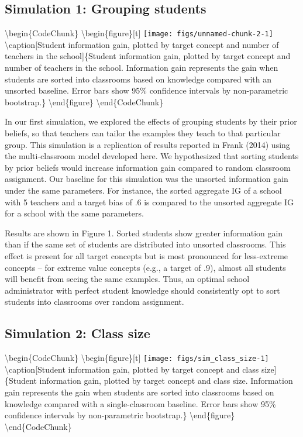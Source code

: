 \documentclass[10pt, letterpaper]{article}
\begin{document}
\subsection{Simulation 1: Grouping
students}\label{simulation-1-grouping-students}

\textbackslash{}begin\{CodeChunk\}
\textbackslash{}begin\{figure\}{[}t{]}
\texttt{[image: figs/unnamed-chunk-2-1]}
\textbackslash{}caption{[}Student information gain, plotted by target
concept and number of teachers in the school{]}\{Student information
gain, plotted by target concept and number of teachers in the school.
Information gain represents the gain when students are sorted into
classrooms based on knowledge compared with an unsorted baseline. Error
bars show 95\% confidence intervals by non-parametric
bootstrap.\}\label{fig:unnamed-chunk-2} \textbackslash{}end\{figure\}
\textbackslash{}end\{CodeChunk\}

In our first simulation, we explored the effects of grouping students by
their prior beliefs, so that teachers can tailor the examples they teach
to that particular group. This simulation is a replication of results
reported in Frank (2014) using the multi-classroom model developed here.
We hypothesized that sorting students by prior beliefs would increase
information gain compared to random classroom assignment. Our baseline
for this simulation was the unsorted information gain under the same
parameters. For instance, the sorted aggregate IG of a school with 5
teachers and a target bias of .6 is compared to the unsorted aggregate
IG for a school with the same parameters.

Results are shown in Figure 1. Sorted students show greater information
gain than if the same set of students are distributed into unsorted
classrooms. This effect is present for all target concepts but is most
pronounced for less-extreme concepts -- for extreme value concepts
(e.g., a target of .9), almost all students will benefit from seeing the
same examples. Thus, an optimal school administrator with perfect
student knowledge should consistently opt to sort students into
classrooms over random assignment.

\subsection{Simulation 2: Class size}\label{simulation-2-class-size}

\textbackslash{}begin\{CodeChunk\}
\textbackslash{}begin\{figure\}{[}t{]}
\texttt{[image: figs/sim\_class\_size-1]}
\textbackslash{}caption{[}Student information gain, plotted by target
concept and class size{]}\{Student information gain, plotted by target
concept and class size. Information gain represents the gain when
students are sorted into classrooms based on knowledge compared with a
single-classroom baseline. Error bars show 95\% confidence intervals by
non-parametric bootstrap.\}\label{fig:sim_class_size}
\textbackslash{}end\{figure\} \textbackslash{}end\{CodeChunk\}
\end{document}
